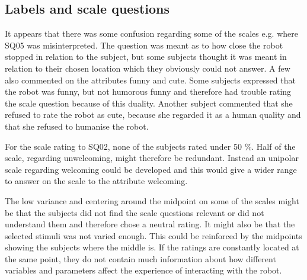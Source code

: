 \subsection{Labels and scale questions}
%
It appears that there was some confusion regarding some of the scales e.g. where SQ05 was misinterpreted. The question was meant as to how close the robot stopped in relation to the subject, but some subjects thought it was meant in relation to their chosen location which they obviously could not answer. A few also commented on the attributes funny and cute. Some subjects expressed that the robot was funny, but not humorous funny and therefore had trouble rating the scale question because of this duality. Another subject commented that she refused to rate the robot as cute, because she regarded it as a human quality and that she refused to humanise the robot.

For the scale rating to SQ02, none of the subjects rated under 50 \%. Half of the scale, regarding unwelcoming, might therefore be redundant. Instead an unipolar scale regarding welcoming could be developed and this would give a wider range to answer on the scale to the attribute welcoming.

The low variance and centering around the midpoint on some of the scales might be that the subjects did not find the scale questions relevant or did not understand them and therefore chose a neutral rating. It might also be that the selected stimuli was not varied enough. This could be reinforced by the midpoints showing the subjects where the middle is. If the ratings are constantly located at the same point, they do not contain much information about how different variables and parameters affect the experience of interacting with the robot.
